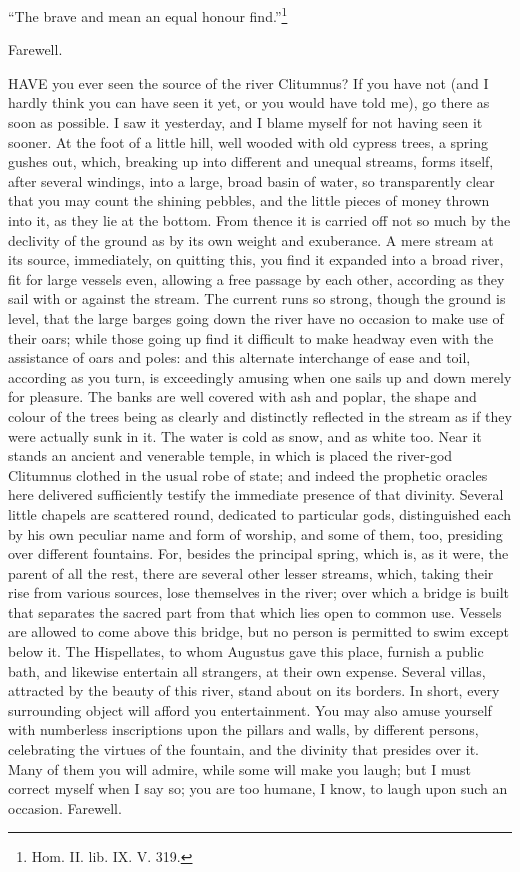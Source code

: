 ``The brave and mean an equal honour find.''\footnote{Hom. II. lib. IX. V.
319.}

Farewell.


HAVE you ever seen the source of the river Clitumnus? If you have not (and
I hardly think you can have seen it yet, or you would have told me), go
there as soon as possible. I saw it yesterday, and I blame myself for not
having seen it sooner. At the foot of a little hill, well wooded with old
cypress trees, a spring gushes out, which, breaking up into different and
unequal streams, forms itself, after several windings, into a large, broad
basin of water, so transparently clear that you may count the shining
pebbles, and the little pieces of money thrown into it, as they lie at the
bottom. From thence it is carried off not so much by the declivity of the
ground as by its own weight and exuberance. A mere stream at its source,
immediately, on quitting this, you find it expanded into a broad river,
fit for large vessels even, allowing a free passage by each other,
according as they sail with or against the stream. The current runs so
strong, though the ground is level, that the large barges going down the
river have no occasion to make use of their oars; while those going up
find it difficult to make headway even with the assistance of oars and
poles: and this alternate interchange of ease and toil, according as you
turn, is exceedingly amusing when one sails up and down merely for
pleasure. The banks are well covered with ash and poplar, the shape and
colour of the trees being as clearly and distinctly reflected in the
stream as if they were actually sunk in it. The water is cold as snow, and
as white too. Near it stands an ancient and venerable temple, in which is
placed the river-god Clitumnus clothed in the usual robe of state; and
indeed the prophetic oracles here delivered sufficiently testify the
immediate presence of that divinity. Several little chapels are scattered
round, dedicated to particular gods, distinguished each by his own
peculiar name and form of worship, and some of them, too, presiding over
different fountains. For, besides the principal spring, which is, as it
were, the parent of all the rest, there are several other lesser streams,
which, taking their rise from various sources, lose themselves in the
river; over which a bridge is built that separates the sacred part from
that which lies open to common use. Vessels are allowed to come above this
bridge, but no person is permitted to swim except below it. The
Hispellates, to whom Augustus gave this place, furnish a public bath, and
likewise entertain all strangers, at their own expense. Several villas,
attracted by the beauty of this river, stand about on its borders. In
short, every surrounding object will afford you entertainment. You may
also amuse yourself with numberless inscriptions upon the pillars and
walls, by different persons, celebrating the virtues of the fountain, and
the divinity that presides over it. Many of them you will admire, while
some will make you laugh; but I must correct myself when I say so; you are
too humane, I know, to laugh upon such an occasion. Farewell.

